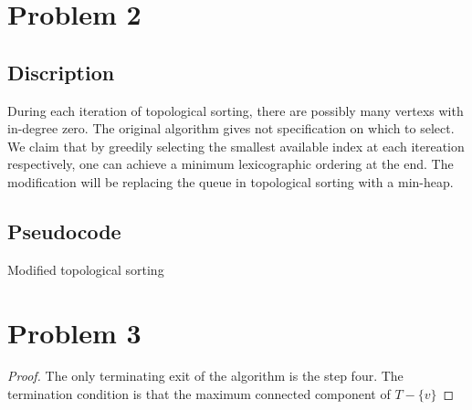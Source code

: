 \documentclass{report}
\begin{document}
    \section*{Problem 2}
    \subsection*{Discription}
    During each iteration of topological sorting, there are possibly many vertexs with 
    in-degree zero. The original algorithm gives not specification on which to select. 
    We claim that by greedily selecting the smallest available index at each itereation 
    respectively, one can achieve a minimum lexicographic ordering at the end.
    The modification will be replacing the queue in topological sorting with a min-heap. 
    \newpage
    \subsection*{Pseudocode}
    \begin{algorithm}
        \caption{Modified topological sorting}
        \begin{algorithmic}[1]
                \EndIf{}
            \EndFor{}
                    \EndIf{}
                \EndFor{}
            \EndWhile{}
        \end{algorithmic}
    \end{algorithm}

    \section*{Problem 3}
    \begin{proof}
    The only terminating exit of the algorithm is the step four. The termination condition
    is that the maximum connected component of $T - \{v\}$
    \end{proof}
\end{document}
